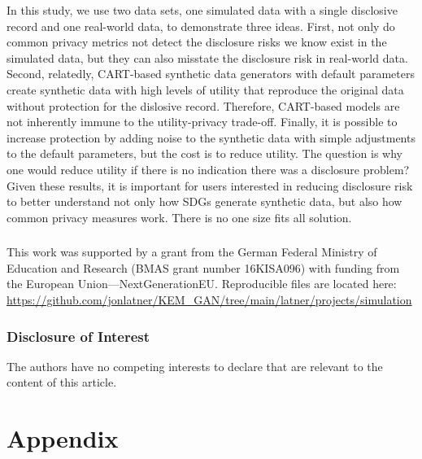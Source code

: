 \documentclass[runningheads]{llncs}
\begin{document}
In this study, we use two data sets, one simulated data with a single disclosive record and one real-world data, to demonstrate three ideas.  First, not only do common privacy metrics not detect the disclosure risks we know exist in the simulated data, but they can also misstate the disclosure risk in real-world data.  Second, relatedly, CART-based synthetic data generators with default parameters create synthetic data with high levels of utility that reproduce the original data without protection for the dislosive record.  Therefore, CART-based models are not inherently immune to the utility-privacy trade-off.  Finally, it is possible to increase protection by adding noise to the synthetic data with simple adjustments to the default parameters, but the cost is to reduce utility.  The question is why one would reduce utility if there is no indication there was a disclosure problem?  Given these results, it is important for users interested in reducing disclosure risk to better understand not only how SDGs generate synthetic data, but also how common privacy measures work.  There is no one size fits all solution. 

\subsubsection{\ackname} This work was supported by a grant from the German Federal Ministry of Education and Research (BMAS grant number 16KISA096) with funding from the European Union—NextGenerationEU.  Reproducible files are located here: \url{https://github.com/jonlatner/KEM\_GAN/tree/main/latner/projects/simulation}

\subsubsection{Disclosure of Interest} The authors have no competing interests to declare that are relevant to the content of this article.




\clearpage
\appendix
\section{Appendix}\label{appendix}
\setcounter{figure}{0}    
\setcounter{table}{0}    
\renewcommand*\thetable{\Alph{section}.\arabic{table}}
\renewcommand*\thefigure{\Alph{section}.\arabic{figure}}
\renewcommand{\theHfigure}{\Alph{section}.\arabic{table}}
\renewcommand{\theHtable}{\Alph{section}.\arabic{figure}}
\end{document}
